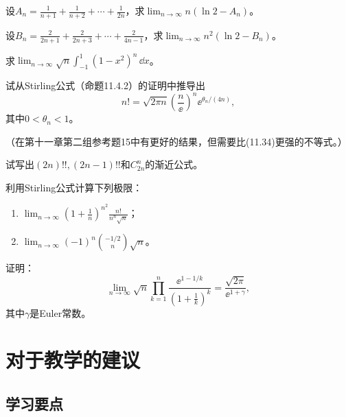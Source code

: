 \begin{xexercise}[4]
设$A_n=\frac1{n+1}+\frac1{n+2}+\cdots+\frac1{2n}$，求$\displaystyle\lim_{n\to\infty}n(\ln2-A_n)$。
\end{xexercise}

\begin{xexercise}[5]
设$B_n=\frac2{2n+1}+\frac2{2n+3}+\cdots+\frac2{4n-1}$，求$\displaystyle\lim_{n\to\infty}n^2(\ln2-B_n)$。
\end{xexercise}

\begin{xexercise}[6]
求$\displaystyle\lim_{n\to\infty}\sqrt n\int_{-1}^1(1-x^2)^n\,\dd x$。
\end{xexercise}

\begin{xexercise}[7]
试从Stirling公式（命题11.4.2）的证明中推导出
  \[
    n!=\sqrt{2\pi n}\left(\frac n\ee\right)^n\ee^{\theta_n/(4n)},
  \]
  其中$0<\theta_n<1$。

  （在第十一章第二组参考题15中有更好的结果，但需要比(11.34)更强的不等式。）
\end{xexercise}

\begin{xexercise}[8]
试写出$(2n)!!,(2n-1)!!$和$C_{2n}^n$的渐近公式。
\end{xexercise}

\begin{xexercise}[9]
利用Stirling公式计算下列极限：
  \begin{enumerate}[label=(\arabic*)]
    \item $\displaystyle\lim_{n\to\infty}\left(1+\frac1n\right)^{n^2}\frac{n!}{n^n\sqrt n}$；
    \item $\displaystyle\lim_{n\to\infty}(-1)^n\binom{-1/2}{n}\sqrt n$。
  \end{enumerate}
\end{xexercise}

\begin{xexercise}[10]
证明：
  \[
    \lim_{n\to\infty}\sqrt n\prod_{k=1}^n
    \frac{\ee^{1-1/k}}{\left(1+\frac1k\right)^k}
    =\frac{\sqrt{2\pi}}{\ee^{1+\gamma}},
  \]
  其中$\gamma$是Euler常数。
\end{xexercise}

\section{对于教学的建议}

\subsection{学习要点}

